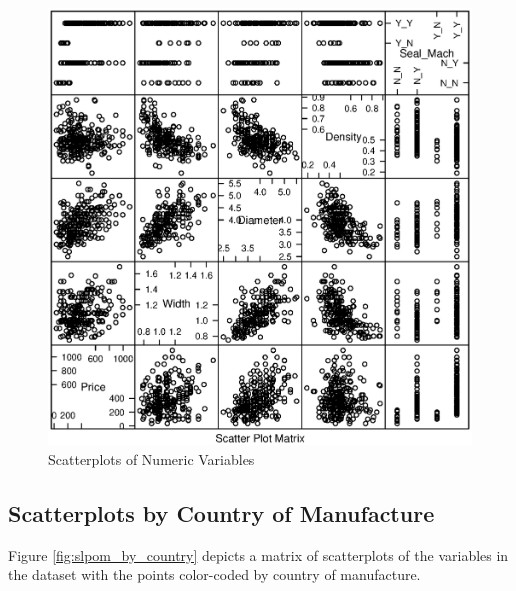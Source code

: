 \documentclass[11pt]{book}
\begin{document}
\begin{figure}[h!]
  \centering
  \includegraphics[scale = 0.5, keepaspectratio=true]{../Figures/slpom_with_sealed_mach.eps}
  \caption{Scatterplots of Numeric Variables} \label{fig:slpom_with_sealed_mach.eps}
\end{figure}



\pagebreak
\subsection*{Scatterplots by Country of Manufacture}

Figure \ref{fig:slpom_by_country} depicts a matrix of scatterplots
of the variables in the dataset
with the points color-coded by country of manufacture.
\end{document}
